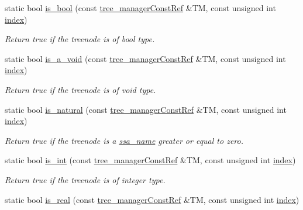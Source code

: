 \begin{DoxyCompactItemize}
static bool \hyperlink{classtree__helper_a23c2062c16635d268a1dc97e50928e47}{is\+\_\+bool} (const \hyperlink{tree__manager_8hpp_a792e3f1f892d7d997a8d8a4a12e39346}{tree\+\_\+manager\+Const\+Ref} \&TM, const unsigned int \hyperlink{tutorial__pact__2019_2Introduction_2third_2include_2Keccak_8h_a028c9bdc8344cca38ab522a337074797}{index})
\begin{DoxyCompactList}\small\item\em Return true if the treenode is of bool type. \end{DoxyCompactList}\item 
static bool \hyperlink{classtree__helper_a262d8de0a44b4f37fa1ecfc0b14b79e8}{is\+\_\+a\+\_\+void} (const \hyperlink{tree__manager_8hpp_a792e3f1f892d7d997a8d8a4a12e39346}{tree\+\_\+manager\+Const\+Ref} \&TM, const unsigned int \hyperlink{tutorial__pact__2019_2Introduction_2third_2include_2Keccak_8h_a028c9bdc8344cca38ab522a337074797}{index})
\begin{DoxyCompactList}\small\item\em Return true if the treenode is of void type. \end{DoxyCompactList}\item 
static bool \hyperlink{classtree__helper_a7d79cc8b2338c134901fb22916b8a57e}{is\+\_\+natural} (const \hyperlink{tree__manager_8hpp_a792e3f1f892d7d997a8d8a4a12e39346}{tree\+\_\+manager\+Const\+Ref} \&TM, const unsigned int \hyperlink{tutorial__pact__2019_2Introduction_2third_2include_2Keccak_8h_a028c9bdc8344cca38ab522a337074797}{index})
\begin{DoxyCompactList}\small\item\em Return true if the treenode is a \hyperlink{structssa__name}{ssa\+\_\+name} greater or equal to zero. \end{DoxyCompactList}\item 
static bool \hyperlink{classtree__helper_a0e90b9e4f5363c7ff726cbeaa8cc8f53}{is\+\_\+int} (const \hyperlink{tree__manager_8hpp_a792e3f1f892d7d997a8d8a4a12e39346}{tree\+\_\+manager\+Const\+Ref} \&TM, const unsigned int \hyperlink{tutorial__pact__2019_2Introduction_2third_2include_2Keccak_8h_a028c9bdc8344cca38ab522a337074797}{index})
\begin{DoxyCompactList}\small\item\em Return true if the treenode is of integer type. \end{DoxyCompactList}\item 
static bool \hyperlink{classtree__helper_a709ed07f7b709f0a6cfd9482aa330414}{is\+\_\+real} (const \hyperlink{tree__manager_8hpp_a792e3f1f892d7d997a8d8a4a12e39346}{tree\+\_\+manager\+Const\+Ref} \&TM, const unsigned int \hyperlink{tutorial__pact__2019_2Introduction_2third_2include_2Keccak_8h_a028c9bdc8344cca38ab522a337074797}{index})

\end{DoxyCompactItemize}
